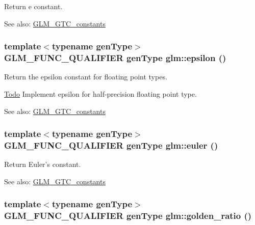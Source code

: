Return e constant. \begin{Desc}
\item[See also:]\hyperlink{group__gtc__constants}{GLM\_\-GTC\_\-constants} \end{Desc}
\hypertarget{group__gtc__constants_g136c74927d8ab624f3c008bcd8c4445b}{
\subsubsection[epsilon]{\setlength{\rightskip}{0pt plus 5cm}template$<$typename genType$>$ GLM\_\-FUNC\_\-QUALIFIER genType glm::epsilon ()}}
\label{group__gtc__constants_g136c74927d8ab624f3c008bcd8c4445b}


Return the epsilon constant for floating point types. \begin{Desc}
\item[\hyperlink{todo__todo000051}{Todo}]Implement epsilon for half-precision floating point type. \end{Desc}
\begin{Desc}
\item[See also:]\hyperlink{group__gtc__constants}{GLM\_\-GTC\_\-constants} \end{Desc}
\hypertarget{group__gtc__constants_g99cfc0dd627ebc20b51d3c9c0f706c6a}{
\subsubsection[euler]{\setlength{\rightskip}{0pt plus 5cm}template$<$typename genType$>$ GLM\_\-FUNC\_\-QUALIFIER genType glm::euler ()}}
\label{group__gtc__constants_g99cfc0dd627ebc20b51d3c9c0f706c6a}


Return Euler's constant. \begin{Desc}
\item[See also:]\hyperlink{group__gtc__constants}{GLM\_\-GTC\_\-constants} \end{Desc}
\hypertarget{group__gtc__constants_g8a045109452784d20481cd2ac053c4e0}{
\subsubsection[golden\_\-ratio]{\setlength{\rightskip}{0pt plus 5cm}template$<$typename genType$>$ GLM\_\-FUNC\_\-QUALIFIER genType glm::golden\_\-ratio ()}}
\label{group__gtc__constants_g8a045109452784d20481cd2ac053c4e0}


